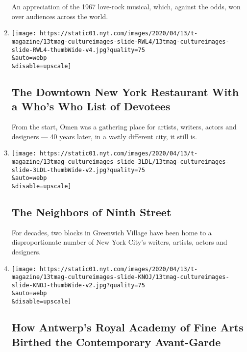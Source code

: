 \begin{enumerate}
  An appreciation of the 1967 love-rock musical, which, against the
  odds, won over audiences across the world.
\item
  \href{/interactive/2020/04/13/t-magazine/omen-restaurant-nyc.html}{}

  \texttt{[image: https://static01.nyt.com/images/2020/04/13/t-magazine/13tmag-cultureimages-slide-RWL4/13tmag-cultureimages-slide-RWL4-thumbWide-v4.jpg?quality=75\\\&auto=webp\\\&disable=upscale]}

  \hypertarget{the-downtown-new-york-restaurant-with-a-whos-who-list-of-devotees}{%
  \subsection{The Downtown New York Restaurant With a Who's Who List of
  Devotees}\label{the-downtown-new-york-restaurant-with-a-whos-who-list-of-devotees}}

  From the start, Omen was a gathering place for artists, writers,
  actors and designers --- 40 years later, in a vastly different city,
  it still is.
\item
  \href{/interactive/2020/04/13/t-magazine/ninth-street-greenwich-village-neighbors.html}{}

  \texttt{[image: https://static01.nyt.com/images/2020/04/13/t-magazine/13tmag-cultureimages-slide-3LDL/13tmag-cultureimages-slide-3LDL-thumbWide-v2.jpg?quality=75\\\&auto=webp\\\&disable=upscale]}

  \hypertarget{the-neighbors-of-ninth-street}{%
  \subsection{The Neighbors of Ninth
  Street}\label{the-neighbors-of-ninth-street}}

  For decades, two blocks in Greenwich Village have been home to a
  disproportionate number of New York City's writers, artists, actors
  and designers.
\item
  \href{/interactive/2020/04/13/t-magazine/royal-academy-antwerp.html}{}

  \texttt{[image: https://static01.nyt.com/images/2020/04/13/t-magazine/13tmag-cultureimages-slide-KNOJ/13tmag-cultureimages-slide-KNOJ-thumbWide-v2.jpg?quality=75\\\&auto=webp\\\&disable=upscale]}

  \hypertarget{how-antwerps-royal-academy-of-fine-arts-birthed-the-contemporary-avant-garde}{%
  \subsection{How Antwerp's Royal Academy of Fine Arts Birthed the
  Contemporary
  Avant-Garde}\label{how-antwerps-royal-academy-of-fine-arts-birthed-the-contemporary-avant-garde}}


\end{enumerate}
